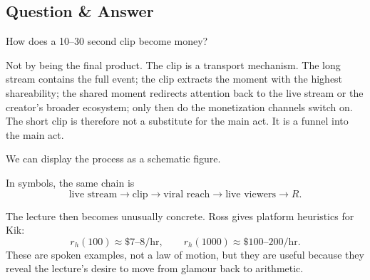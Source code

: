 \subsection{Question \& Answer}

How does a 10--30 second clip become money?

Not by being the final product. The clip is a transport mechanism. The long stream contains the full event; the clip extracts the moment with the highest shareability; the shared moment redirects attention back to the live stream or the creator's broader ecosystem; only then do the monetization channels switch on. The short clip is therefore not a substitute for the main act. It is a funnel into the main act.

We can display the process as a schematic figure.

\begin{figure}
\centering
{}
\end{figure}

In symbols, the same chain is
\begin{equation}
\text{live stream} \to \text{clip} \to \text{viral reach} \to \text{live viewers} \to R.
\end{equation}

The lecture then becomes unusually concrete. Ross gives platform heuristics for Kik:
\begin{equation}
r_h(100) \approx \$7\text{--}8/\text{hr},\qquad
r_h(1000) \approx \$100\text{--}200/\text{hr}.
\end{equation}
These are spoken examples, not a law of motion, but they are useful because they reveal the lecture's desire to move from glamour back to arithmetic.

